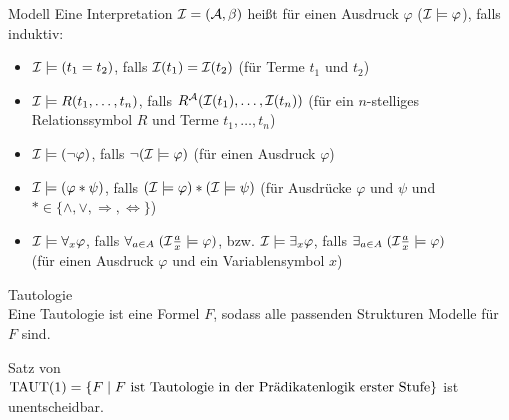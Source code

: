 \begin{Def}{Modell}
    Eine Interpretation $\mathcal{I} = (\mathcal{A}, \beta)$ heißt  für einen Ausdruck $\varphi$
    ($\mathcal{I} \models \varphi$), falls induktiv:
    \begin{itemize}
        \item
        $\mathcal{I} \models (t_1 = t_2)$, falls $\mathcal{I}(t_1) = \mathcal{I}(t_2)$
        (für Terme $t_1$ und $t_2$)
        
        \item
        $\mathcal{I} \models R(t_1, \dotsc, t_n)$, falls $R^{\mathcal{A}}(\mathcal{I}(t_1), \dotsc, \mathcal{I}(t_n))$
        (für ein $n$-stelliges Relationssymbol $R$ und Terme $t_1, \dotsc, t_n$)
        
        \item
        $\mathcal{I} \models (\lnot\varphi)$, falls $\lnot(\mathcal{I} \models \varphi)$
        (für einen Ausdruck $\varphi$)
        
        \item
        $\mathcal{I} \models (\varphi \ast \psi)$, falls $(\mathcal{I} \models \varphi) \ast (\mathcal{I} \models \psi)$
        (für Ausdrücke $\varphi$ und $\psi$ und
        $\ast \in \{\land, \lor, \Rightarrow, \Leftrightarrow\}$)
        
        \item
        $\mathcal{I} \models \forall_x \varphi$, falls
        $\forall_{a \in A}\; (\mathcal{I}\frac{a}{x} \models \varphi)$, bzw.
        $\mathcal{I} \models \exists_x \varphi$, falls
        $\exists_{a \in A}\; (\mathcal{I}\frac{a}{x} \models \varphi)$\\
        (für einen Ausdruck $\varphi$ und ein Variablensymbol $x$)
    \end{itemize}
\end{Def}

\linie
\pagebreak

\begin{Def}{Tautologie}\\
    Eine Tautologie ist eine Formel $F$, sodass alle passenden Strukturen Modelle für $F$ sind.
\end{Def}

\begin{Satz}{Satz von \upshape\,\!}\\
    $\text{TAUT}(1) = \{F \;|\; F \text{ ist Tautologie in der Prädikatenlogik erster Stufe}\}$
    ist unentscheidbar.
\end{Satz}

